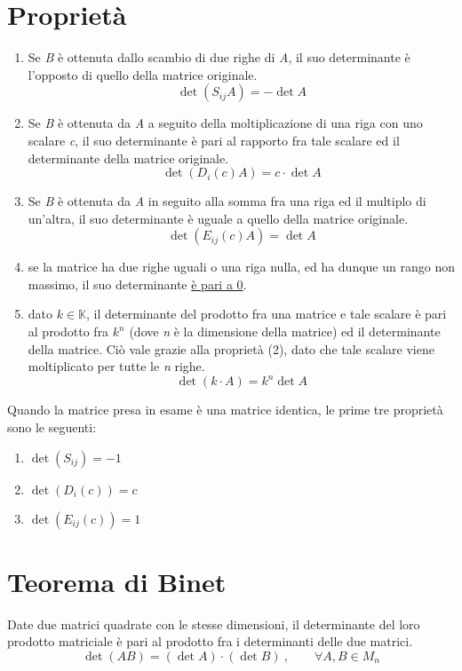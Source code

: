 	\section{Proprietà}
		\begin{enumerate}[(1)]
			\item Se \textit{B} è ottenuta dallo scambio di due righe di \textit{A}, il suo determinante è l'opposto di quello della matrice originale.
			$$ \det (S_{ij} A) = - \det A $$
			\item Se \textit{B} è ottenuta da \textit{A} a seguito della moltiplicazione di una riga con uno scalare \textit{c}, il suo determinante è pari al rapporto fra tale scalare ed il determinante della matrice originale.
			$$ \det (D_i (c) A) = c \cdot \det A $$
			\item Se \textit{B} è ottenuta da \textit{A} in seguito alla somma fra una riga ed il multiplo di un'altra, il suo determinante è uguale a quello della matrice originale.
			$$ \det (E_{ij}(c)A) = \det A $$
			\item se la matrice ha due righe uguali o una riga nulla, ed ha dunque un rango non massimo, il suo determinante \underline{è pari a 0}.
			\item dato $k \in \mathbb{K}$, il determinante del prodotto fra una matrice e tale scalare è pari al prodotto fra $k^n$ (dove \textit{n} è la dimensione della matrice) ed il determinante della matrice. Ciò vale grazie alla proprietà (2), dato che tale scalare viene moltiplicato per tutte le \textit{n} righe.
			$$ \det (k \cdot A) = k^n \det A $$
		\end{enumerate}
		
		Quando la matrice presa in esame è una matrice identica, le prime tre proprietà sono le seguenti:
		\begin{enumerate}[(1')]
			\item $\det (S_{ij}) = -1 $
			\item $\det (D_i (c)) = c $
			\item $\det (E_{ij} (c)) = 1 $
		\end{enumerate}
	
	\section{Teorema di Binet}
		Date due matrici quadrate con le stesse dimensioni, il determinante del loro prodotto matriciale è pari al prodotto fra i determinanti delle due matrici.
		$$ \det (A B) = (\det A) \cdot (\det B) \: , \qquad \forall A, B \in M_n$$
	
